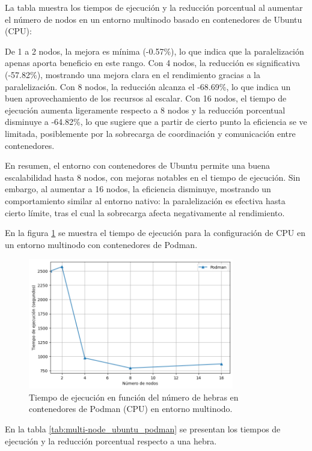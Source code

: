La tabla muestra los tiempos de ejecución y la reducción porcentual al aumentar el número de nodos en un entorno multinodo basado en contenedores de Ubuntu (CPU):

De 1 a 2 nodos, la mejora es mínima (-0.57\%), lo que indica que la paralelización apenas aporta beneficio en este rango. Con 4 nodos, la reducción es significativa (-57.82\%), mostrando una mejora clara en el rendimiento gracias a la paralelización. Con 8 nodos, la reducción alcanza el -68.69\%, lo que indica un buen aprovechamiento de los recursos al escalar. Con 16 nodos, el tiempo de ejecución aumenta ligeramente respecto a 8 nodos y la reducción porcentual disminuye a -64.82\%, lo que sugiere que a partir de cierto punto la eficiencia se ve limitada, posiblemente por la sobrecarga de coordinación y comunicación entre contenedores.

En resumen, el entorno con contenedores de Ubuntu permite una buena escalabilidad hasta 8 nodos, con mejoras notables en el tiempo de ejecución. Sin embargo, al aumentar a 16 nodos, la eficiencia disminuye, mostrando un comportamiento similar al entorno nativo: la paralelización es efectiva hasta cierto límite, tras el cual la sobrecarga afecta negativamente al rendimiento.

En la figura \ref{fig:multi-node_ubuntu_podman} se muestra el tiempo de ejecución para la configuración de CPU en un entorno multinodo con contenedores de Podman.

\begin{figure}[H]
    \centering
    \includegraphics[width=0.8\textwidth]{imagenes/cap5/multi-node_ubuntu_podman_time.png}
    \caption{Tiempo de ejecución en función del número de hebras en contenedores de Podman (CPU) en entorno multinodo.}
    \label{fig:multi-node_ubuntu_podman}
\end{figure}

En la tabla \ref{tab:multi-node_ubuntu_podman} se presentan los tiempos de ejecución y la reducción porcentual respecto a una hebra.

